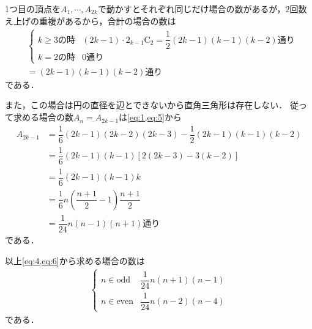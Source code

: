 \documentclass[../../main.tex]{subfiles}
\begin{document}
1つ目の頂点を$A_1,\cdots,A_{2k}$で動かすとそれぞれ同じだけ場合の数があるが，$2$回数え上げの重複があるから，合計の場合の数は
\begin{align}
  &
  \begin{cases}
    k \ge 3 \text{の時} & (2k-1) \cdot 2{}_{k-1}\mathrm{C}_2 = \dfrac{1}{2}(2k-1)(k-1)(k-2)\text{通り} \\
    k = 2 \text{の時} & 0 \text{通り}
  \end{cases} \\
  &= (2k-1)(k-1)(k-2)\text{通り} \label{eq:5}
\end{align}
である．

また，この場合は円の直径を辺とできないから直角三角形は存在しない．
従って求める場合の数$A_{n}=A_{2k-1}$は\cref{eq:1,eq:5}から
\begin{align}
  A_{2k-1}
  &= \dfrac{1}{6}(2k-1)(2k-2)(2k-3) - \dfrac{1}{2}(2k-1)(k-1)(k-2) \\
  &= \dfrac{1}{6}(2k-1)(k-1)\left[2(2k-3)-3(k-2)\right] \\
  &= \dfrac{1}{6}(2k-1)(k-1)k \\
  &= \dfrac{1}{6}n(\dfrac{n+1}{2}-1)\dfrac{n+1}{2} \\
  &= \dfrac{1}{24}n(n-1)(n+1) \text{通り} \label{eq:6}
\end{align}
である．
\casesend

以上\cref{eq:4,eq:6}から求める場合の数は
\begin{align}
  \begin{cases}
    n \in \text{odd} & \dfrac{1}{24}n(n+1)(n-1) \\
    n \in \text{even} & \dfrac{1}{24}n(n-2)(n-4)
  \end{cases}
\end{align}
である．
\end{document}
